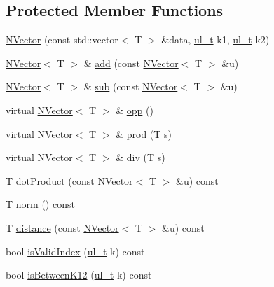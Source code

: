 \subsection*{Protected Member Functions}
\begin{DoxyCompactItemize}
\item 
\mbox{\hyperlink{class_n_vector_a402111a5a467efd5741e6a17fbd5c903}{N\+Vector}} (const std\+::vector$<$ T $>$ \&data, \mbox{\hyperlink{typedef_8h_a1b140a2034db3f5dfe18a987745df43a}{ul\+\_\+t}} k1, \mbox{\hyperlink{typedef_8h_a1b140a2034db3f5dfe18a987745df43a}{ul\+\_\+t}} k2)
\item 
\mbox{\hyperlink{class_n_vector}{N\+Vector}}$<$ T $>$ \& \mbox{\hyperlink{class_n_vector_a82d1863c00d57ccfed9e2d74a8d1bfd5}{add}} (const \mbox{\hyperlink{class_n_vector}{N\+Vector}}$<$ T $>$ \&u)
\item 
\mbox{\hyperlink{class_n_vector}{N\+Vector}}$<$ T $>$ \& \mbox{\hyperlink{class_n_vector_a67b62da878e1bfa873d714b87ae3d6ee}{sub}} (const \mbox{\hyperlink{class_n_vector}{N\+Vector}}$<$ T $>$ \&u)
\item 
virtual \mbox{\hyperlink{class_n_vector}{N\+Vector}}$<$ T $>$ \& \mbox{\hyperlink{class_n_vector_a92087679da6949a3fd0ce2c8329c5044}{opp}} ()
\item 
virtual \mbox{\hyperlink{class_n_vector}{N\+Vector}}$<$ T $>$ \& \mbox{\hyperlink{class_n_vector_a0b7f80da288093be295a09df9720bccc}{prod}} (T s)
\item 
virtual \mbox{\hyperlink{class_n_vector}{N\+Vector}}$<$ T $>$ \& \mbox{\hyperlink{class_n_vector_a3a9aa1000751225bc530490bde95b51e}{div}} (T s)
\item 
T \mbox{\hyperlink{class_n_vector_abd35a43ccd6973efe24624572570d99f}{dot\+Product}} (const \mbox{\hyperlink{class_n_vector}{N\+Vector}}$<$ T $>$ \&u) const
\item 
T \mbox{\hyperlink{class_n_vector_a99c134693de1e2b5f9d8f524d9cfd07a}{norm}} () const
\item 
T \mbox{\hyperlink{class_n_vector_aac9fc2b4c051f5011398a9fad6f7d452}{distance}} (const \mbox{\hyperlink{class_n_vector}{N\+Vector}}$<$ T $>$ \&u) const
\item 
bool \mbox{\hyperlink{class_n_vector_ad993b3d62002abc9d89ebf053003341d}{is\+Valid\+Index}} (\mbox{\hyperlink{typedef_8h_a1b140a2034db3f5dfe18a987745df43a}{ul\+\_\+t}} k) const
\item 
bool \mbox{\hyperlink{class_n_vector_a5c23df071f027cb26f1af69910159aa5}{is\+Between\+K12}} (\mbox{\hyperlink{typedef_8h_a1b140a2034db3f5dfe18a987745df43a}{ul\+\_\+t}} k) const

\end{DoxyCompactItemize}
